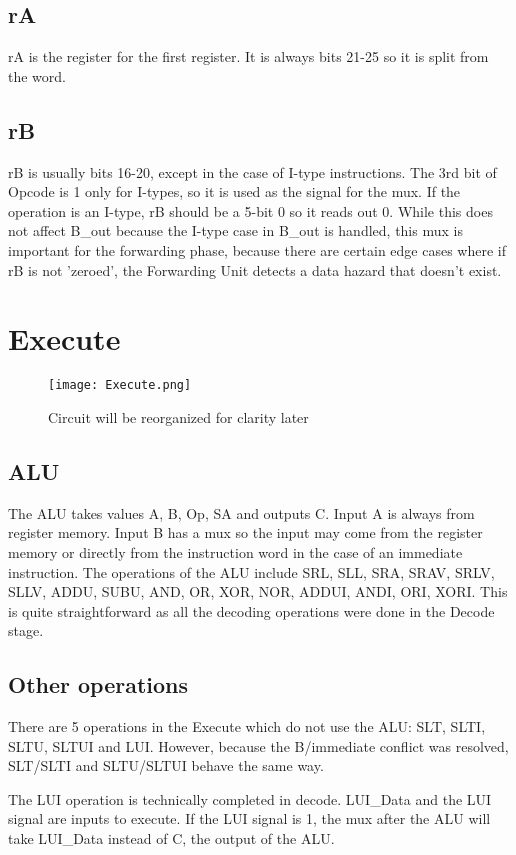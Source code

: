 \documentclass[10pt]{article}
\begin{document}
\subsection{rA}
rA is the register for the first register. It is always bits 21-25 so it is split from the word. 

\subsection{rB}
rB is usually bits 16-20, except in the case of I-type instructions. The 3rd bit of Opcode is 1 only for I-types, so it is used as the signal for the mux. If the operation is an I-type, rB should be a 5-bit 0 so it reads out 0. While this does not affect B\_out because the I-type case in B\_out is handled, this mux is important for the forwarding phase, because there are certain edge cases where if rB is not 'zeroed', the Forwarding Unit detects a data hazard that doesn't exist.


\newpage
\section{Execute}
\begin{figure}[h]
    \texttt{[image: Execute.png]}
    \caption{Circuit will be reorganized for clarity later}
\end{figure}

\subsection{ALU}
 The ALU takes values A, B, Op, SA and outputs C. Input A is always from register memory. Input B has a mux so the input may come from the register memory or directly from the instruction word in the case of an immediate instruction. The operations of the ALU include SRL, SLL, SRA, SRAV, SRLV, SLLV, ADDU, SUBU, AND, OR, XOR, NOR, ADDUI, ANDI, ORI, XORI. This is quite straightforward as all the decoding operations were done in the Decode stage.

\subsection{Other operations}
There are 5 operations in the Execute which do not use the ALU: SLT, SLTI, SLTU, SLTUI and LUI. However, because the B/immediate conflict was resolved, SLT/SLTI and SLTU/SLTUI behave the same way.

The LUI operation is technically completed in decode. LUI\_Data and the LUI signal are inputs to execute. If the LUI signal is 1, the mux after the ALU will take LUI\_Data instead of C, the output of the ALU.
\end{document}
